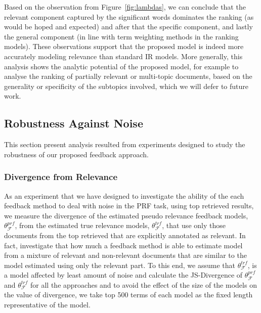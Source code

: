 Based on the observation from Figure~\ref{fig:lambdas}, we can conclude that the relevant component captured by the significant words dominates the ranking (as would be hoped and expected) and after that the specific component, and lastly the general component (in line with term weighting methods in the ranking models). These observations support that the proposed model is indeed more accurately modeling relevance than standard IR models.
More generally, this analysis shows the analytic potential of the proposed model, for example to analyse the ranking of partially relevant or multi-topic documents, based on the generality or specificity of the subtopics involved, which we will defer to future work.


\subsection{Robustness Against Noise}
\label{sec:robustness}
This section present analysis resulted from experiments designed to study the robustness of our proposed feedback approach.


\subsubsection{Divergence from Relevance}
\label{sec:DfR}
As an experiment that we have designed to investigate the ability of the each feedback method to deal with noise in the PRF task, using top retrieved results, we measure the divergence of the estimated pseudo relevance feedback models, $\theta_{\mathcal{F}}^{prf}$, from the estimated true relevance models, $\theta_{\mathcal{F}}^{trf}$, that use only those documents from the top retrieved that are explicitly annotated as relevant.
%
%
In fact, investigate that how much a feedback method is able to estimate model from a mixture of relevant and non-relevant documents that are similar to the model estimated using only the relevant part. 
To this end, we assume that $\theta_{\mathcal{F}}^{trf}$, is a model affected by least amount of noise and calculate the JS-Divergence of $\theta_{\mathcal{F}}^{prf}$ and  $\theta_{\mathcal{F}}^{trf}$ for all the approaches and 
to avoid the effect of the size of the models on the value of divergence, we take top 500 terms of each model as the fixed length representative of the model. 

